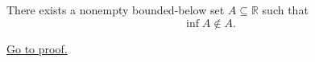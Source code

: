 \begin{proposition}
\label{prop:infimum-need-not-belong-to-the-set}
There exists a nonempty bounded-below set $A\subseteq\mathbb{R}$ such that
\[
  \inf A\notin A.
\]

\hyperref[prf:infimum-need-not-belong-to-the-set]{Go to proof.}
\end{proposition}